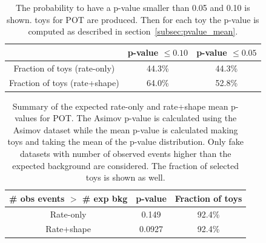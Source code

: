 %





\begin{table}
\centering
\begin{tabular}{| c | c | c |}
\hline
		                                          	& p-value $\leq 0.10$    		& p-value $\leq 0.05$ 		\\
\hline
Fraction of toys	(rate-only)			& 44.3\%					& 44.3\%				\\
Fraction of toys	(rate+shape) 		& 64.0\%					& 52.8\%				\\
\hline
\end{tabular}
\caption{
The probability to have a p-value smaller than 0.05 and 0.10 is shown.
\NumToysLarge toys for
\TotalPot POT
are produced.
Then for each toy the p-value is computed as described in section~\ref{subsec:pvalue_mean}.
}
\label{tab:pvalue_mean_0p05_lowpot}
\end{table}

%
%
%


\begin{table}
\centering
\begin{tabular}{| c | c | c |}
\hline
\# obs events $>$ \# exp bkg		& p-value    	 & Fraction of toys    	\\
\hline
Rate-only                          			&   0.149    	& 92.4\%             	\\
Rate+shape                          		&   0.0927   	& 92.4\%                 	\\
\hline
\end{tabular}
\caption{
Summary of the expected rate-only and rate+shape mean p-values for 
\TotalPot POT.
The Asimov p-value is calculated using the Asimov dataset while the 
mean p-value is calculated making \NumToysLarge toys and taking the mean 
of the p-value distribution.
Only fake datasets with number of observed events higher than the
expected background are considered.
The fraction of selected toys is shown as well. 
}
\label{tab:pvalue_mean_bkg_lowpot}
\end{table}

